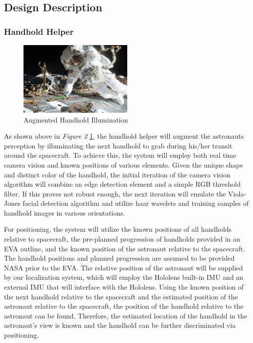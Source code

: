 \documentclass{article}
\let\Oldsubsection\subsection
\renewcommand{\subsection}{\FloatBarrier\Oldsubsection}
\let\Oldsubsubsection\subsubsection
\renewcommand{\subsubsection}{\FloatBarrier\Oldsubsubsection}
\begin{document}
\subsection{Design Description}

\subsubsection{Handhold Helper}

\begin{figure}[!htb]
  \centering
  \includegraphics[width=0.5\textwidth]{assets/markedhandrail.png}
  \caption{Augmented Handhold Illumination}
  \label{fig:markedhandrail}
\end{figure}

As shown above in \textit{Figure 2} \ref{fig:markedhandrail}, the handhold helper will augment the astronauts perception by illuminating the next handhold to grab during his/her transit around the spacecraft. To achieve this, the system will employ both real time camera vision and known positions of various elements. Given the unique shape and distinct color of the handhold, the initial iteration of the camera vision algorithm will combine an edge detection element and a simple RGB threshold filter. If this proves not robust enough, the next iteration will emulate the Viola-Jones facial detection algorithm and utilize haar wavelets and training samples of handhold images in various orientations.

For positioning, the system will utilize the known positions of all handholds relative to spacecraft, the pre-planned progression of handholds provided in an EVA outline, and the known position of the astronaut relative to the spacecraft. The handhold positions and planned progression are assumed to be provided NASA prior to the EVA. The relative position of the astronaut will be supplied by our localization system, which will employ the Hololens built-in IMU and an external IMU that will interface with the Hololens. Using the known position of the next handhold relative to the spacecraft and the estimated position of the astronaut relative to the spacecraft, the position of the handhold relative to the astronaut can be found. Therefore, the estimated location of the handhold in the astronaut’s view is known and the handhold can be further discriminated via positioning.
\end{document}
